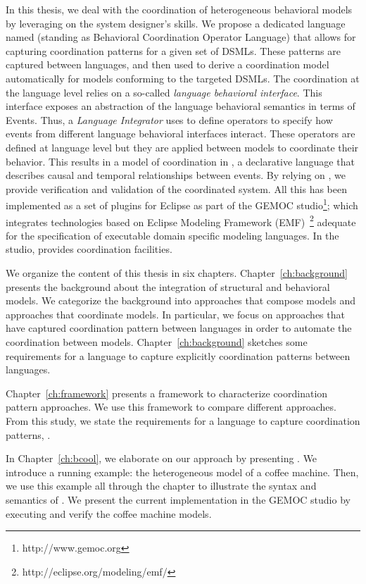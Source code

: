 In this thesis, we deal with the coordination of heterogeneous behavioral models by leveraging on the system designer's skills. We propose a dedicated language named \bcool (standing as Behavioral Coordination Operator Language) that allows for capturing coordination patterns for a given set of DSMLs. These patterns are captured between languages, and then used to derive a coordination model automatically for models conforming to the targeted DSMLs. The coordination at the language level relies on a so-called \emph{language behavioral interface}. This interface exposes an abstraction of the language behavioral semantics in terms of Events. Thus, a \emph{Language Integrator} uses \bcool to define operators to specify how events from different language behavioral interfaces interact. These operators are defined at language level but they are applied between models to coordinate their behavior. This results in a model of coordination in \ccsl, a declarative language that describes causal and temporal relationships between events. By relying on \ccsl, we provide verification and validation of the coordinated system. All this has been implemented as a set of plugins for Eclipse as part of the GEMOC studio\footnote{http://www.gemoc.org}; which integrates technologies based on Eclipse Modeling Framework (EMF)~\footnote{http://eclipse.org/modeling/emf/} adequate for the specification of executable domain specific modeling languages. In the studio, \bcool provides coordination facilities.   

We organize the content of this thesis in six chapters. Chapter~\ref{ch:background} presents the background about the integration of structural and behavioral models. We categorize the background into approaches that compose models and approaches that coordinate models. In particular, we focus on approaches that have captured coordination pattern between languages in order to automate the coordination between models. Chapter~\ref{ch:background} sketches some requirements for a language to capture explicitly coordination patterns between languages.    

Chapter~\ref{ch:framework} presents a framework to characterize coordination pattern approaches. We use this framework to compare different approaches. From this study, we state the requirements for a language to capture coordination patterns, \ie \bcool.  

In Chapter~\ref{ch:bcool}, we elaborate on our approach by presenting \bcool. We introduce a running example: the heterogeneous model of a coffee machine. Then, we use this example all through the chapter to illustrate the syntax and semantics of \bcool. We present the current implementation in the GEMOC studio by executing and verify the coffee machine models. 

